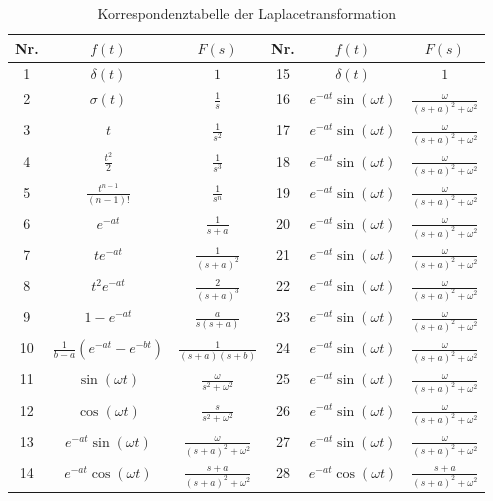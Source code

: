 \begin{table}[h!]
\caption{Korrespondenztabelle der Laplacetransformation}
\centering
\setlength{\extrarowheight}{0.40cm} 
\begin{tabular}{|c|c|c|c|c|c|} \hline
	Nr. & $\displaystyle f(t)$ & $\displaystyle F(s)$ & Nr. & $\displaystyle f(t)$ & $\displaystyle F(s)$
			\tabularnewline [0.4cm] \hline 
	1   & $\displaystyle \delta(t)$ & $\displaystyle 1$ & 15  & $\displaystyle \delta(t)$ & $\displaystyle 1$ 														
			\tabularnewline [0.4cm] \hline
	2 	& $\displaystyle \sigma(t)$ & $\displaystyle \frac{1}{s}$& 16 	& $\displaystyle e^{-at} \sin(\omega t)$ & $\displaystyle \frac{\omega}{(s+a)^2 + \omega^2}$									
			\tabularnewline [0.4cm] \hline
	3 	& $\displaystyle t$ & $\displaystyle \frac{1}{s^2}$&	17 	& $\displaystyle e^{-at} \sin(\omega t)$ & $\displaystyle \frac{\omega}{(s+a)^2 + \omega^2}$
			\tabularnewline [0.4cm] \hline
	4 	& $\displaystyle \frac{t^2}{2}$ & $\displaystyle \frac{1}{s^3}$& 18 	& $\displaystyle e^{-at} \sin(\omega t)$ & $\displaystyle \frac{\omega}{(s+a)^2 + \omega^2}$
			\tabularnewline [0.4cm] \hline
	5 	& $\displaystyle \frac{t^{n-1}}{(n-1)!}$ & $\displaystyle \frac{1}{s^n}$& 19 	& $\displaystyle e^{-at} \sin(\omega t)$ & $\displaystyle \frac{\omega}{(s+a)^2 + \omega^2}$															
			\tabularnewline [0.4cm] \hline
	6 	& $\displaystyle e^{-at}$ & $\displaystyle \frac{1}{s+a}$ &	20 	& $\displaystyle e^{-at} \sin(\omega t)$ & $\displaystyle \frac{\omega}{(s+a)^2 + \omega^2}$			
			\tabularnewline [0.4cm] \hline
	7 	& $\displaystyle t e^{-at}$ & $\displaystyle \frac{1}{(s+a)^2}$&  21 	& $\displaystyle e^{-at} \sin(\omega t)$ & $\displaystyle \frac{\omega}{(s+a)^2 + \omega^2}$
			\tabularnewline [0.4cm] \hline
	8 	& $\displaystyle t^2 e^{-at}$ & $\displaystyle	\frac{2}{(s+a)^3}$& 22 	& $\displaystyle e^{-at} \sin(\omega t)$ & $\displaystyle \frac{\omega}{(s+a)^2 + \omega^2}$
			\tabularnewline [0.4cm] \hline
	9 	& $\displaystyle 1-e^{-at}$ & $\displaystyle \frac{a}{s (s+a)}$&23 	& $\displaystyle e^{-at} \sin(\omega t)$ & $\displaystyle \frac{\omega}{(s+a)^2 + \omega^2}$
			\tabularnewline [0.4cm] \hline
	10  & $\displaystyle \frac{1}{b-a} (e^{-at} - e^{-bt})$ & $\displaystyle \frac{1}{(s+a)(s+b)}$&24 	& $\displaystyle e^{-at} \sin(\omega t)$ & $\displaystyle \frac{\omega}{(s+a)^2 + \omega^2}$
			\tabularnewline [0.4cm] \hline
	11 	& $\displaystyle \sin(\omega t)$ & $\displaystyle \frac{\omega}{s^2 + \omega^2}$& 25 	& $\displaystyle e^{-at} \sin(\omega t)$ & $\displaystyle \frac{\omega}{(s+a)^2 + \omega^2}$
			\tabularnewline [0.4cm] \hline
	12 	& $\displaystyle \cos(\omega t)$ & $\displaystyle \frac{s}{s^2 + \omega^2}$& 26 	& $\displaystyle e^{-at} \sin(\omega t)$ & $\displaystyle \frac{\omega}{(s+a)^2 + \omega^2}$
			\tabularnewline [0.4cm] \hline
	13 	& $\displaystyle e^{-at} \sin(\omega t)$ & $\displaystyle \frac{\omega}{(s+a)^2 + \omega^2}$&  27 	& $\displaystyle e^{-at} \sin(\omega t)$ & $\displaystyle \frac{\omega}{(s+a)^2 + \omega^2}$ 
			\tabularnewline [0.4cm] \hline
	14 	& $\displaystyle e^{-at} \cos(\omega t)$ & $\displaystyle \frac{s+a}{(s+a)^2 + \omega^2}$ & 28 	& $\displaystyle e^{-at} \cos(\omega t)$ & $\displaystyle \frac{s+a}{(s+a)^2 + \omega^2}$ 
			\tabularnewline [0.4cm] \hline
\end{tabular}
\end{table}